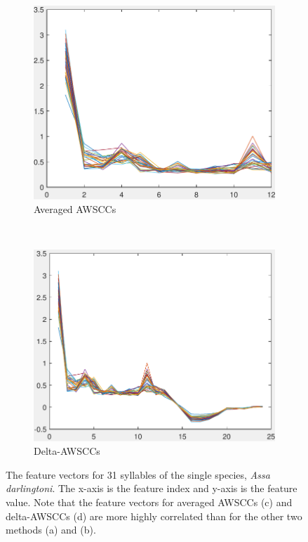 \begin{figure}[htb!]
                \begin{subfigure}[b]{0.5\textwidth}
                \includegraphics[width=\textwidth]{image/Ch5/avgPWSCC.pdf}
                \caption{Averaged AWSCCs}
        \end{subfigure}%
        ~ 
        \begin{subfigure}[b]{0.5\textwidth}
                \includegraphics[width=\textwidth]{image/Ch5/deltaPWSCC.pdf}
                \caption{Delta-AWSCCs}
        \end{subfigure}
        \caption[The feature vectors for 31 syllables of the single species, \textit{Assa darlingtoni}]{The feature vectors for 31 syllables of the single species, \textit{Assa darlingtoni}. The x-axis is the feature index and y-axis
is the feature value. Note that the feature vectors for averaged AWSCCs (c) and delta-AWSCCs (d) are more highly correlated than for the other two methods (a) and (b).}       
        \label{fig:Ch5_feature}
\end{figure}


